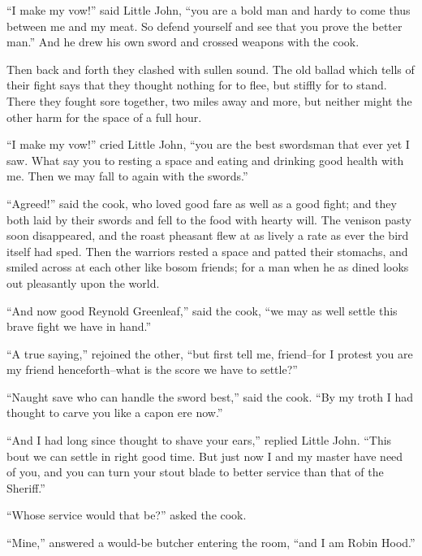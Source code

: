 ``I make my vow!'' said Little John, ``you are a bold man and hardy to
come thus between me and my meat. So defend yourself and see that you
prove the better man.'' And he drew his own sword and crossed weapons
with the cook.

Then back and forth they clashed with sullen sound. The old ballad which
tells of their fight says that they thought nothing for to flee, but
stiffly for to stand. There they fought sore together, two miles away
and more, but neither might the other harm for the space of a full hour.

``I make my vow!'' cried Little John, ``you are the best swordsman that
ever yet I saw. What say you to resting a space and eating and drinking
good health with me. Then we may fall to again with the swords.''

``Agreed!'' said the cook, who loved good fare as well as a good fight;
and they both laid by their swords and fell to the food with hearty
will. The venison pasty soon disappeared, and the roast pheasant flew at
as lively a rate as ever the bird itself had sped. Then the warriors
rested a space and patted their stomachs, and smiled across at each
other like bosom friends; for a man when he as dined looks out
pleasantly upon the world.

``And now good Reynold Greenleaf,'' said the cook, ``we may as well
settle this brave fight we have in hand.''

``A true saying,'' rejoined the other, ``but first tell me, friend--for
I protest you are my friend henceforth--what is the score we have to
settle?''

``Naught save who can handle the sword best,'' said the cook. ``By my
troth I had thought to carve you like a capon ere now.''

``And I had long since thought to shave your ears,'' replied Little
John. ``This bout we can settle in right good time. But just now I and
my master have need of you, and you can turn your stout blade to better
service than that of the Sheriff.''

``Whose service would that be?'' asked the cook.

``Mine,'' answered a would-be butcher entering the room, ``and I am
Robin Hood.''
